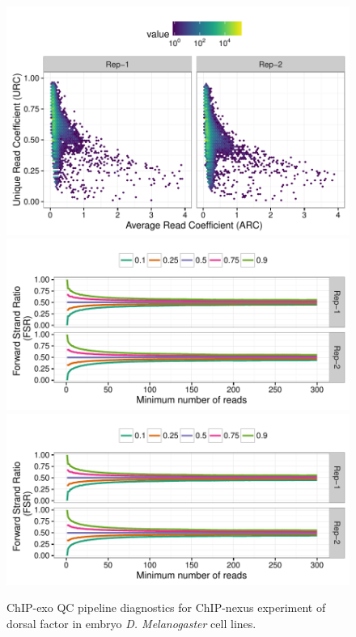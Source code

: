 \documentclass{article}
\begin{document}
\begin{figure}[H]
  \centering
  \includegraphics[width = .65\textwidth,page =
1]{figures/supplement/QC/ChIPnexus_embryo_dorsal_enrichment.pdf}\\
\includegraphics[width = .65\textwidth,page =
1]{figures/supplement/QC/ChIPnexus_embryo_dorsal_strand_imbalance.pdf}
\includegraphics[width = .65\textwidth,page =
3]{figures/supplement/QC/ChIPnexus_embryo_dorsal_strand_imbalance.pdf}
\caption{ChIP-exo QC pipeline diagnostics for ChIP-nexus experiment of
  dorsal factor in embryo \emph{D. Melanogaster} cell lines.}
  \label{sfig:qc7}
\end{figure}
\end{document}
